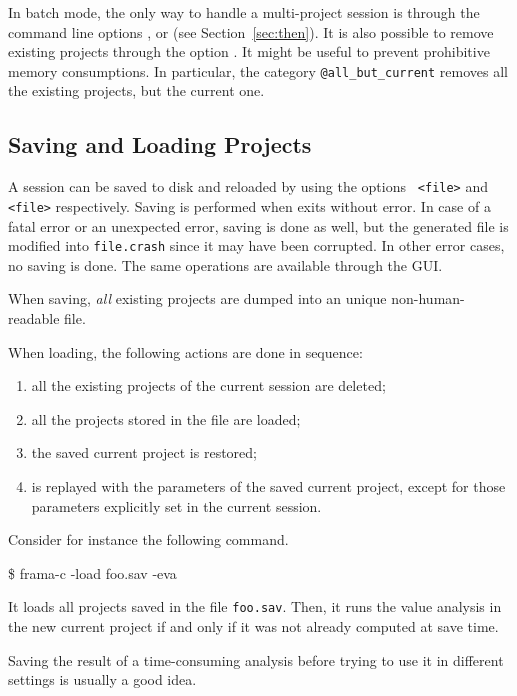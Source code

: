 In batch mode, the only way to handle a multi-project session is through
the command line options ,  or
 (see Section~\ref{sec:then}). It is also possible to
remove existing projects through the option . It
might be useful to prevent prohibitive memory consumptions. In particular, the
category \texttt{@all\_but\_current} removes all the existing projects, but the
current one.

\subsection{Saving and Loading Projects}\label{sec:saveload}

A session can be saved to disk and reloaded by using the options
\texttt{ <file>} and \texttt{ <file>}
respectively. Saving is performed when \FramaC exits without error. In case of a
fatal error or an unexpected error, saving is done as well, but the generated
file is modified into \texttt{file.crash} since it may have been corrupted. In
other error cases, no saving is done. The same operations are available
through the GUI.

When saving, \emph{all} existing projects are dumped into an unique
non-human-readable file.

When loading, the following actions are done in sequence:
\begin{enumerate}
\item all the existing projects of the current session are deleted;
\item all the projects stored in the file are loaded;
\item the saved current project is restored;
\item \FramaC is replayed with the parameters of the saved current project,
  except for those parameters explicitly set in the current session.
\end{enumerate}

Consider for instance the following command.
\begin{shell}
\$ frama-c -load foo.sav -eva
\end{shell}
It loads all projects saved in the file \texttt{foo.sav}. Then, it runs the
value analysis in the new current project if and only if it was not already
computed at save time.

\begin{convention}
Saving the result of a time-consuming analysis before trying to use it in
different settings is usually a good idea.
\end{convention}

